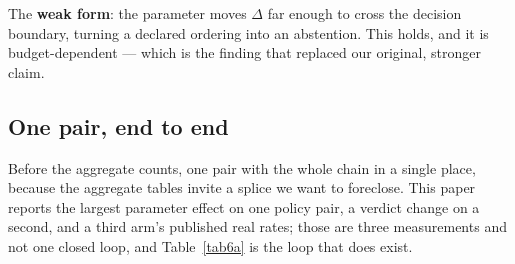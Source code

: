 \documentclass[pdflatex,iicol,sn-apa]{sn-jnl}
\theoremstyle{remark}
\begin{document}
The \textbf{weak form}: the parameter moves $\Delta$ far enough to cross the decision boundary,
turning a declared ordering into an abstention. This holds, and it is budget-dependent --- which is
the finding that replaced our original, stronger claim.

\subsection{One pair, end to end}\label{subsec7_1b}

Before the aggregate counts, one pair with the whole chain in a single place, because the aggregate
tables invite a splice we want to foreclose. This paper reports the largest parameter effect on one
policy pair, a verdict change on a second, and a third arm's published real rates; those are three
measurements and not one closed loop, and Table~\ref{tab6a} is the loop that does exist.
\end{document}
